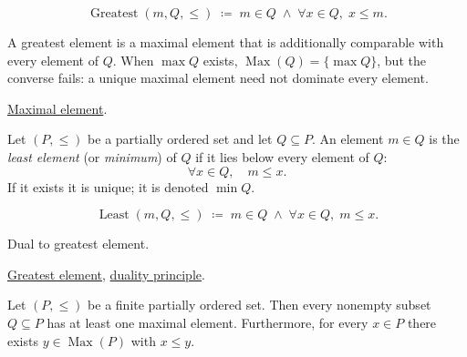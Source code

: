 \begin{remark*}
\[
\operatorname{Greatest}(m, Q, \leq)
\;\coloneqq\;
m \in Q \;\land\; \forall x \in Q,\; x \leq m.
\]
\end{remark*}

\begin{remark*}[Interpretation]
A greatest element is a maximal element that is additionally comparable
with every element of $Q$.  When $\max Q$ exists,
$\operatorname{Max}(Q) = \{\max Q\}$, but the converse fails: a unique
maximal element need not dominate every element.
\end{remark*}

\begin{remark*}[Dependencies]
\hyperref[def:maximal-element]{Maximal element}.
\end{remark*}


\begin{definition}
\label{def:least-element}
Let $(P, \leq)$ be a partially ordered set and let $Q \subseteq P$.  An
element $m \in Q$ is the \emph{least element} (or \emph{minimum}) of $Q$
if it lies below every element of $Q$:
\[
\forall x \in Q, \quad m \leq x.
\]
If it exists it is unique; it is denoted $\min Q$.
\end{definition}

\begin{remark*}
\[
\operatorname{Least}(m, Q, \leq)
\;\coloneqq\;
m \in Q \;\land\; \forall x \in Q,\; m \leq x.
\]
\end{remark*}

\begin{remark*}[Interpretation]
Dual to greatest element.
\end{remark*}

\begin{remark*}[Dependencies]
\hyperref[def:greatest-element]{Greatest element},
\hyperref[prop:duality-principle]{duality principle}.
\end{remark*}


\begin{proposition}
\label{prop:finite-poset-maximal}
Let $(P, \leq)$ be a finite partially ordered set.  Then every nonempty
subset $Q \subseteq P$ has at least one maximal element.  Furthermore,
for every $x \in P$ there exists $y \in \operatorname{Max}(P)$ with
$x \leq y$.
\end{proposition}

